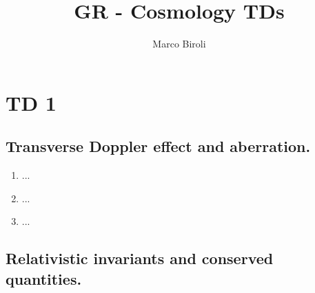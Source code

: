 \documentclass[10pt,a4paper]{book}
\author{Marco Biroli}
\title{GR - Cosmology TDs}
\begin{document}
\maketitle

\chapter{TD 1}
\section{Transverse Doppler effect and aberration.}
\begin{enumerate}
\item ...
\item ...
\item ...
\end{enumerate}

\section{Relativistic invariants and conserved quantities.}
\end{document}
